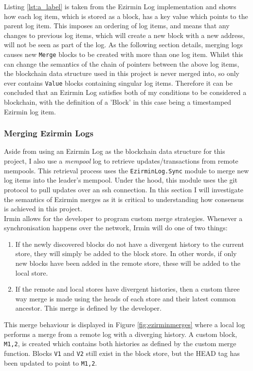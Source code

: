 \documentclass[12pt,a4paper,twoside,openright]{report}
\begin{document}
	Listing \ref{lst:a_label} is taken from the Ezirmin Log implementation and shows how each log item, which is stored as a block, has a key value which points to the parent log item. 
	This imposes an ordering of log items, and means that any changes to previous log items, which will create a new block with a new address, will not be seen as part of the log. 
	As the following section details, merging logs causes new \texttt{Merge} blocks to be created with more than one log item.
	Whilst this can change the semantics of the chain of pointers between the above log items, the blockchain data structure used in this project is never merged into, so only ever contains \texttt{Value} blocks containing singular log items.
	Therefore it can be concluded that an Ezirmin Log satisfies both of my conditions to be considered a blockchain, with the definition of a 'Block' in this case being a timestamped Ezirmin log item.

	\subsubsection*{Merging Ezirmin Logs}
	Aside from using an Ezirmin Log as the blockchain data structure for this project, I also use a \textit{mempool} log to retrieve updates/transactions from remote mempools. 
	This retrieval process uses the \texttt{EzirminLog.Sync} module to merge new log items into the leader's mempool.
	Under the hood, this module uses the git protocol to pull updates over an ssh connection.
	In this section I will investigate the semantics of Ezirmin merges as it is critical to understanding how consensus is achieved in this project.\\
	
	Irmin allows for the developer to program custom merge strategies. 
	Whenever a synchronisation happens over the network, Irmin will do one of two things:
	\begin{enumerate}
		\item If the newly discovered blocks do not have a divergent history to the current store, they will simply be added to the block store. 
			In other words, if only new blocks have been added in the remote store, these will be added to the local store. 
		\item If the remote and local stores have divergent histories, then a custom three way merge is made using the heads of each store and their latest common ancestor.
		This merge is defined by the developer.
	\end{enumerate}
	This merge behaviour is displayed in Figure \ref{fig:ezirminmerges} where a local log performs a merge from a remote log with a diverging history.
	A custom block, \texttt{M1,2}, is created which contains both histories as defined by the custom merge function. 
	Blocks \texttt{V1} and \texttt{V2} still exist in the block store, but the HEAD tag has been updated to point to \texttt{M1,2}. \\
\end{document}
